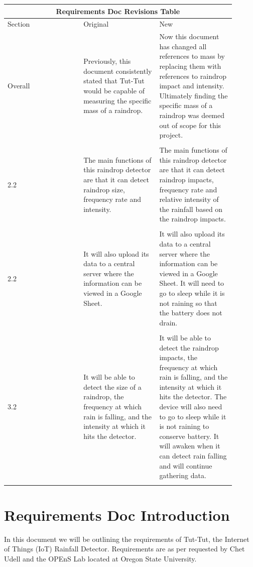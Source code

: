 \documentclass[letterpaper,10pt,draftclsnofoot,onecolumn]{article}
\begin{document}
\begin{center}
\begin{tabular}{ |p{0.3\linewidth}|p{0.3\linewidth}|p{0.3\linewidth}| }
\hline
\multicolumn{3}{|c|}{Requirements Doc Revisions Table} \\
\hline
Section & Original & New \\
\hline
Overall &
Previously, this document consistently stated that Tut-Tut would be capable of measuring the specific mass of a raindrop. &
Now this document has changed all references to mass by replacing them with references to raindrop impact and intensity. Ultimately finding the specific mass of a raindrop was deemed out of scope for this project. \\
 & \\
2.2 &
The main functions of this raindrop detector are that it can detect raindrop size, frequency rate and intensity. &
The main functions of this raindrop detector are that it can detect raindrop impacts, frequency rate and relative intensity of the rainfall based on the raindrop impacts. \\
 & \\
2.2 &
It will also upload its data to a central server where the information can be viewed in a Google Sheet. &
It will also upload its data to a central server where the information can be viewed in a Google Sheet. It will need to go to sleep while it is not raining so that the battery does not drain. \\
 & \\
3.2 &
It will be able to detect the size of a raindrop, the frequency at which rain is falling, and the intensity at which it hits the detector. &
It will be able to detect the raindrop impacts, the frequency at which rain is falling, and the intensity at which it hits the detector. The device will also need to go to sleep while it is not raining to conserve battery. It will awaken when it can detect rain falling and will continue gathering data. \\
 & \\
\hline
\end{tabular}
\end{center}

\section{Requirements Doc Introduction}
In this document we will be outlining the requirements of Tut-Tut, the Internet of Things (IoT) Rainfall Detector. Requirements are as per requested by Chet Udell and the OPEnS Lab located at Oregon State University.
\end{document}
